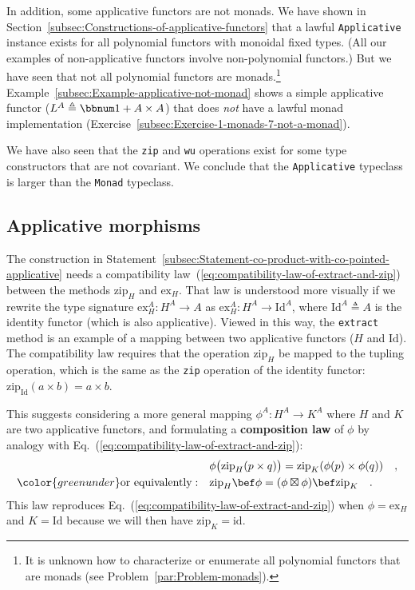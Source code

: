 In addition, some applicative functors are not monads. We have shown
in Section~\ref{subsec:Constructions-of-applicative-functors} that
a lawful \lstinline!Applicative! instance exists for all polynomial
functors with monoidal fixed types. (All our examples of non-applicative
functors involve non-polynomial functors.) But we have seen that not
all polynomial functors are monads.\footnote{It is unknown how to characterize or enumerate all polynomial functors
that are monads (see Problem~\ref{par:Problem-monads}).} Example~\ref{subsec:Example-applicative-not-monad} shows a simple
applicative functor ($L^{A}\triangleq\bbnum 1+A\times A$)
that does \emph{not} have a lawful monad implementation (Exercise~\ref{subsec:Exercise-1-monads-7-not-a-monad}).

We have also seen that the \lstinline!zip! and \lstinline!wu! operations
exist for some type constructors that are not covariant. We conclude
that the \lstinline!Applicative! typeclass is larger than the \lstinline!Monad!
typeclass.

\subsection{Applicative morphisms\label{subsec:Applicative-morphisms}}

The construction in Statement~\ref{subsec:Statement-co-product-with-co-pointed-applicative}
needs a compatibility law~(\ref{eq:compatibility-law-of-extract-and-zip})
between the methods $\text{zip}_{H}$ and $\text{ex}_{H}$. That law
is understood more visually if we rewrite the type signature $\text{ex}_{H}^{A}:H^{A}\rightarrow A$
as $\text{ex}_{H}^{A}:H^{A}\rightarrow\text{Id}^{A}$, where $\text{Id}^{A}\triangleq A$
is the identity functor (which is also applicative). Viewed in this
way, the \lstinline!extract! method is an example of a mapping between
two applicative functors ($H$ and $\text{Id}$). The compatibility
law requires that the operation $\text{zip}_{H}$ be mapped to the
tupling operation, which is the same as the \lstinline!zip! operation
of the identity functor: $\text{zip}_{\text{Id}}(a\times b)=a\times b$.

This suggests considering a more general mapping $\phi^{A}:H^{A}\rightarrow K^{A}$
where $H$ and $K$ are two applicative functors, and formulating
a \textbf{composition law}
of $\phi$ by analogy with Eq.~(\ref{eq:compatibility-law-of-extract-and-zip}):
\begin{align*}
 & \phi\big(\text{zip}_{H}(p\times q)\big)=\text{zip}_{K}(\phi(p)\times\phi(q))\quad,\\
{\color{greenunder}\text{or equivalently}:}\quad & \text{zip}_{H}\bef\phi=(\phi\boxtimes\phi)\bef\text{zip}_{K}\quad.
\end{align*}
This law reproduces Eq.~(\ref{eq:compatibility-law-of-extract-and-zip})
when $\phi=\text{ex}_{H}$ and $K=\text{Id}$ because we will then
have $\text{zip}_{K}=\text{id}$. 

